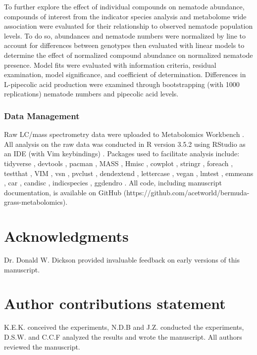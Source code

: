 \documentclass[fleqn,10pt]{wlscirep}
\begin{document}
To further explore the effect of individual compounds on nematode abundance, compounds of interest from the indicator species analysis and metabolome wide association were evaluated for their relationship to observed nematode population levels.  To do so, abundances and nematode numbers were normalized by line to account for differences between genotypes then evaluated with linear models to determine the effect of normalized compound abundance on normalized nematode presence. Model fits were evaluated with information criteria, residual examination, model significance, and coefficient of determination.  Differences in L-pipecolic acid production were examined through bootstrapping (with 1000 replications) nematode numbers and pipecolic acid levels.  


\subsubsection*{Data Management}

Raw LC/mass spectrometry data were uploaded to Metabolomics Workbench \cite{sud2015metabolomics}.  All analysis on the raw data was conducted in R version 3.5.2 using RStudio as an IDE (with Vim keybindings) \cite{rcore2018,rstudio}.  Packages used to facilitate analysis include: tidyverse \cite{tidyverse}, devtools \cite{devtools}, pacman \cite{pacman}, MASS \cite{mass}, Hmisc \cite{hmisc}, cowplot \cite{cowplot}, stringr \cite{stringr}, foreach \cite{foreach}, testthat \cite{testthat}, VIM \cite{VIM}, vsn \cite{vsn}, pvclust \cite{pvclust}, dendextend \cite{dendextend}, lettercase \cite{lettercase}, vegan \cite{vegan}, lmtest \cite{lmtest}, emmeans \cite{emmeans}, car \cite{car}, candisc \cite{candisc}, indicspecies \cite{indicspecies}, ggdendro \cite{ggdendro}.  All code, including manuscript documentation, is available on GitHub (https://github.com/acetworld/bermuda-grass-metabolomics).  



\section*{Acknowledgments}

Dr. Donald W. Dickson provided invaluable feedback on early versions of this manuscript.

\section*{Author contributions statement}


K.E.K. conceived the experiments, N.D.B and J.Z. conducted the experiments, D.S.W. and C.C.F analyzed the results and wrote the manuscript.  All authors reviewed the manuscript. 
\end{document}
